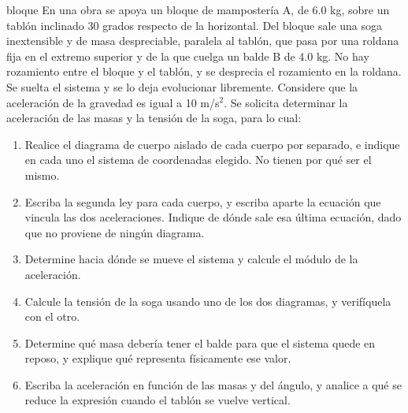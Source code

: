 \documentclass[11pt,openany]{book}
\begin{document}
\begin{ejercicio}{bloque}
En una obra se apoya un bloque de mampostería A, de 6.0 kg, sobre un tablón inclinado 30 grados respecto de la horizontal. Del bloque sale una soga inextensible y de masa despreciable, paralela al tablón, que pasa por una roldana fija en el extremo superior y de la que cuelga un balde B de 4.0 kg. No hay rozamiento entre el bloque y el tablón, y se desprecia el rozamiento en la roldana. Se suelta el sistema y se lo deja evolucionar libremente. Considere que la aceleración de la gravedad es igual a 10 m/s$^2$. Se solicita determinar la aceleración de las masas y la tensión de la soga, para lo cual:
\begin{enumerate}[label=(\alph*), leftmargin=1.7em, itemsep=1pt, topsep=3pt]
  \item Realice el diagrama de cuerpo aislado de cada cuerpo por separado, e indique en cada uno el sistema de coordenadas elegido. No tienen por qué ser el mismo.
  \item Escriba la segunda ley para cada cuerpo, y escriba aparte la ecuación que vincula las dos aceleraciones. Indique de dónde sale esa última ecuación, dado que no proviene de ningún diagrama.
  \item Determine hacia dónde se mueve el sistema y calcule el módulo de la aceleración.
  \item Calcule la tensión de la soga usando uno de los dos diagramas, y verifíquela con el otro.
  \item Determine qué masa debería tener el balde para que el sistema quede en reposo, y explique qué representa físicamente ese valor.
  \item Escriba la aceleración en función de las masas y del ángulo, y analice a qué se reduce la expresión cuando el tablón se vuelve vertical.
\end{enumerate}
\end{ejercicio}
\end{document}
